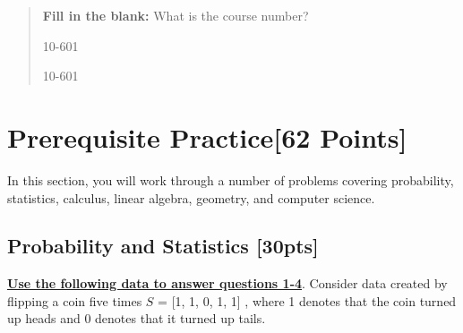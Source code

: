 \documentclass[12pt]{article}
\begin{document}
\begin{quote}
\textbf{Fill in the blank:} What is the course number?

\begin{tcolorbox}[fit,height=1cm, width=4cm, blank, borderline={1pt}{-2pt},nobeforeafter]
    \begin{center}\huge10-601\end{center}
    \end{tcolorbox}\hspace{2cm}
    \begin{tcolorbox}[fit,height=1cm, width=4cm, blank, borderline={1pt}{-2pt},nobeforeafter]
    \begin{center}\huge10-601\end{center}
    \end{tcolorbox}
\end{quote}



\section{Prerequisite Practice[62 Points]}

In this section, you will work through a number of problems covering probability, statistics, calculus, linear algebra, geometry, and computer science. 

\subsection{Probability and Statistics [30pts]}

\textbf{\underline{Use the following data to answer questions 1-4}}. Consider data created by flipping a coin five times $S $ = [1, 1, 0, 1, 1] , where 1 denotes that the coin turned up heads and 0 denotes that it turned up tails. \bigskip
\end{document}

